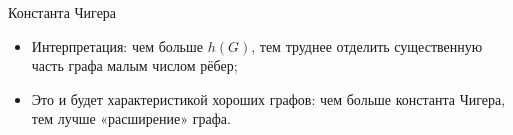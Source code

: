 \documentclass[serif, aspectratio=169]{beamer}
\begin{document}
\begin{frame}{Константа Чигера}
\begin{itemize}
\begin{center}
\begin{actionenv}
\begin{minipage}[t]{0.31\linewidth}
\\[-2ex]
                {\scriptsize $|U|=5,\ |\partial U|=5,\ h(G)=1$}
            \end{minipage}
            \end{actionenv}
        \end{center}
        \vspace{1ex}
        \item Интерпретация: чем больше $h(G)$, тем труднее отделить существенную часть графа малым числом рёбер;
        \item Это и будет характеристикой хороших графов: чем больше константа Чигера, тем лучше «расширение» графа.
    \end{itemize}
    \note{
        \begin{itemize}
            \item ---
        \end{itemize}
    }
\end{frame}
\end{document}

